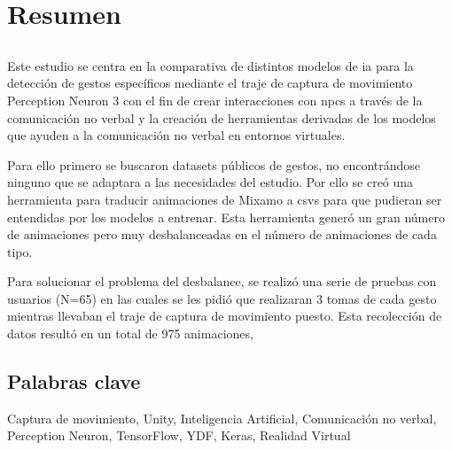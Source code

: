 \chapter*{Resumen}

\section*{\tituloPortadaVal}

Este estudio se centra en la comparativa de distintos modelos de \gls{ia} para la detección de gestos específicos mediante el traje de captura de movimiento Perception Neuron 3 con el fin de crear interacciones con \glspl{npc} a través de la comunicación no verbal y la creación de herramientas derivadas de los modelos que ayuden a la comunicación no verbal en entornos virtuales.

Para ello primero se buscaron datasets públicos de gestos, no encontrándose ninguno que se adaptara a las necesidades del estudio. Por ello se creó una herramienta para traducir animaciones de Mixamo a \glspl{csv} para que pudieran ser entendidas por los modelos a entrenar. Esta herramienta generó un gran número de animaciones pero muy desbalanceadas en el número de animaciones de cada tipo.

Para solucionar el problema del desbalance, se realizó una serie de pruebas con usuarios (N=65) en las cuales se les pidió que realizaran 3 tomas de cada gesto mientras llevaban el traje de captura de movimiento puesto. Esta recolección de datos resultó en un total de 975 animaciones,

\section*{Palabras clave}

\noindent Captura de movimiento, Unity, Inteligencia Artificial, Comunicación no verbal, Perception Neuron, TensorFlow, YDF, Keras, Realidad Virtual




